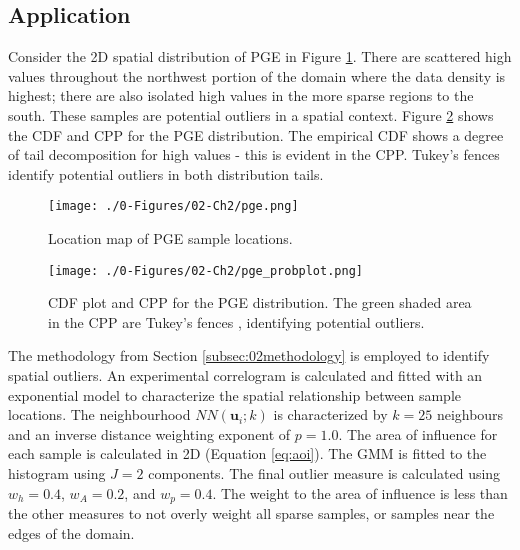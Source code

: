 \FloatBarrier
\subsection{Application}
\label{subsec:02application}

Consider the \gls{2D} spatial distribution of \gls{PGE} in Figure \ref{fig:pge}. There are scattered high values throughout the northwest portion of the domain where the data density is highest; there are also isolated high values in the more sparse regions to the south. These samples are potential outliers in a spatial context. Figure \ref{fig:pge_probplot} shows the \gls{CDF} and \gls{CPP} for the \gls{PGE} distribution. The empirical \gls{CDF} shows a degree of tail decomposition for high values - this is evident in the \gls{CPP}. Tukey's fences \citep{tukey1977exploratory} identify potential outliers in both distribution tails.

\begin{figure}[htb!]
    \centering
    \texttt{[image: ./0-Figures/02-Ch2/pge.png]}
    \caption{Location map of \gls{PGE} sample locations. }
    \label{fig:pge}
\end{figure}

\begin{figure}[htb!]
    \centering
    \texttt{[image: ./0-Figures/02-Ch2/pge\_probplot.png]}
    \caption{\Gls{CDF} plot and \gls{CPP} for the \gls{PGE} distribution. The green shaded area in the \gls{CPP} are Tukey's fences \citep{tukey1977exploratory}, identifying potential outliers. }
    \label{fig:pge_probplot}
\end{figure}

The methodology from Section \ref{subsec:02methodology} is employed to identify spatial outliers. An experimental correlogram is calculated and fitted with an exponential model to characterize the spatial relationship between sample locations. The neighbourhood $NN(\mathbf{u}_{i}; k)$ is characterized by $k=25$ neighbours and an inverse distance weighting exponent of $p=1.0$. The area of influence for each sample is calculated in \gls{2D} (Equation \ref{eq:aoi}). The \gls{GMM} is fitted to the histogram using $J=2$ components. The final outlier measure is calculated using $w_{h}=0.4$, $w_{A}=0.2$, and $w_{p}=0.4$. The weight to the area of influence is less than the other measures to not overly weight all sparse samples, or samples near the edges of the domain.

